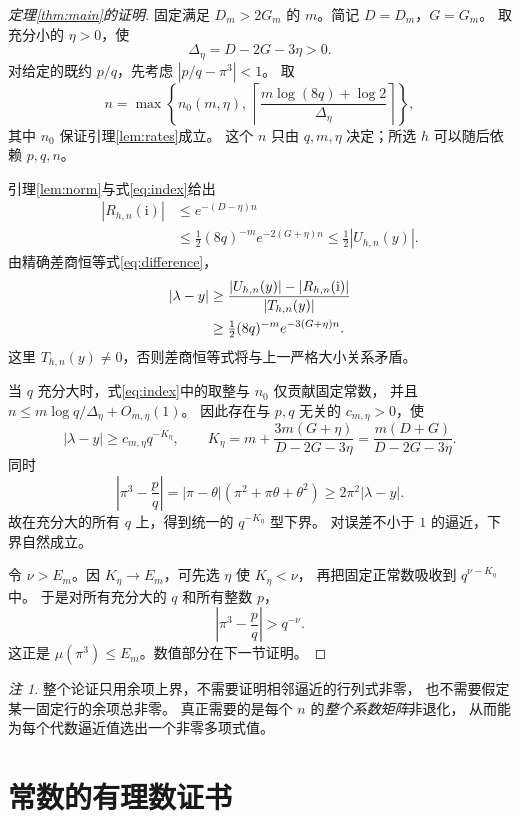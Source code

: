 \documentclass[UTF8,fontset=fandol,a4paper,11pt]{ctexart}
\theoremstyle{remark}
\newtheorem{remark}[theorem]{注}
\newcommand{\ii}{\mathrm i}
\numberwithin{equation}{section}
\begin{document}
\begin{proof}[定理\ref{thm:main}的证明]
固定满足 $D_m>2G_m$ 的 $m$。简记 $D=D_m$，$G=G_m$。
取充分小的 $\eta>0$，使
\[
\Delta_\eta=D-2G-3\eta>0.
\]
对给定的既约 $p/q$，先考虑 $|p/q-\pi^3|<1$。
取
\begin{equation}\label{eq:index}
n=\max\left\{n_0(m,\eta),\,
\left\lceil\frac{m\log(8q)+\log2}{\Delta_\eta}\right\rceil\right\},
\end{equation}
其中 $n_0$ 保证引理\ref{lem:rates}成立。
这个 $n$ 只由 $q,m,\eta$ 决定；所选 $h$ 可以随后依赖 $p,q,n$。

引理\ref{lem:norm}与式\eqref{eq:index}给出
\begin{align*}
|R_{h,n}(\ii)|
 &\le e^{-(D-\eta)n}\\
 &\le\tfrac12(8q)^{-m}e^{-2(G+\eta)n}
 \le\tfrac12|U_{h,n}(y)|.
\end{align*}
由精确差商恒等式\eqref{eq:difference}，
\begin{align}
|\lambda-y|
&\ge\frac{|U_{h,n}(y)|-|R_{h,n}(\ii)|}{|T_{h,n}(y)|}\notag\\
&\ge\tfrac12(8q)^{-m}e^{-3(G+\eta)n}.
\label{eq:lambdalower}
\end{align}
这里 $T_{h,n}(y)\ne0$，否则差商恒等式将与上一严格大小关系矛盾。

当 $q$ 充分大时，式\eqref{eq:index}中的取整与 $n_0$ 仅贡献固定常数，
并且 $n\le m\log q/\Delta_\eta+O_{m,\eta}(1)$。
因此存在与 $p,q$ 无关的 $c_{m,\eta}>0$，使
\[
|\lambda-y|\ge c_{m,\eta}q^{-K_\eta},\qquad
K_\eta=m+\frac{3m(G+\eta)}{D-2G-3\eta}
       =\frac{m(D+G)}{D-2G-3\eta}.
\]
同时
\[
\left|\pi^3-\frac pq\right|
=|\pi-\theta|(\pi^2+\pi\theta+\theta^2)
\ge2\pi^2|\lambda-y|.
\]
故在充分大的所有 $q$ 上，得到统一的 $q^{-K_\eta}$ 型下界。
对误差不小于 $1$ 的逼近，下界自然成立。

令 $\nu>E_m$。因 $K_\eta\to E_m$，可先选 $\eta$ 使 $K_\eta<\nu$，
再把固定正常数吸收到 $q^{\nu-K_\eta}$ 中。
于是对所有充分大的 $q$ 和所有整数 $p$，
\[
\left|\pi^3-\frac pq\right|>q^{-\nu}.
\]
这正是 $\mu(\pi^3)\le E_m$。数值部分在下一节证明。
\end{proof}

\begin{remark}
整个论证只用余项上界，不需要证明相邻逼近的行列式非零，
也不需要假定某一固定行的余项总非零。
真正需要的是每个 $n$ 的\emph{整个系数矩阵}非退化，
从而能为每个代数逼近值选出一个非零多项式值。
\end{remark}

\section{常数的有理数证书}
\end{document}
